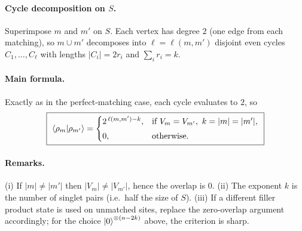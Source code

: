 \documentclass[11pt]{article}
\begin{document}
\paragraph{Cycle decomposition on $S$.}
Superimpose $m$ and $m'$ on $S$. Each vertex has degree $2$ (one edge from each matching),
so $m\cup m'$ decomposes into $\ell=\ell(m,m')$ disjoint even cycles
$C_1,\dots,C_\ell$ with lengths $|C_i|=2r_i$ and $\sum_i r_i=k$.

\paragraph{Main formula.}
Exactly as in the perfect-matching case, each cycle evaluates to $2$, so
\[
\boxed{\ \braket{\rho_m|\rho_{m'}}=
\begin{cases}
2^{\,\ell(m,m')-k}, & \text{if } V_m=V_{m'},\ k=|m|=|m'|,\\[3pt]
0, & \text{otherwise.}
\end{cases}\ }
\]

\paragraph{Remarks.}
(i) If $|m|\neq |m'|$ then $|V_m|\neq |V_{m'}|$, hence the overlap is $0$.
(ii) The exponent $k$ is the number of singlet pairs (i.e.\ half the size of $S$).
(iii) If a different filler product state is used on unmatched sites, replace the zero-overlap
argument accordingly; for the choice $\ket{0}^{\otimes (n-2k)}$ above, the criterion is sharp.
\end{document}

